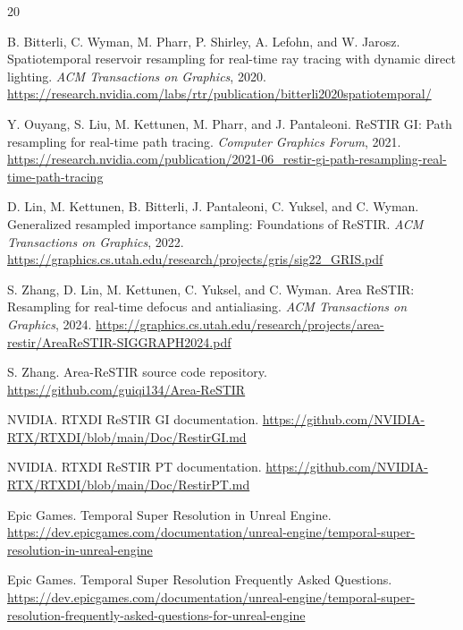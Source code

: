 \documentclass[11pt]{article}
\begin{document}
\clearpage
\begin{thebibliography}{20}
\small

B. Bitterli, C. Wyman, M. Pharr, P. Shirley, A. Lefohn, and W. Jarosz.
\newblock Spatiotemporal reservoir resampling for real-time ray tracing with dynamic direct lighting.
\newblock \emph{ACM Transactions on Graphics}, 2020.
\newblock \url{https://research.nvidia.com/labs/rtr/publication/bitterli2020spatiotemporal/}

Y. Ouyang, S. Liu, M. Kettunen, M. Pharr, and J. Pantaleoni.
\newblock ReSTIR GI: Path resampling for real-time path tracing.
\newblock \emph{Computer Graphics Forum}, 2021.
\newblock \url{https://research.nvidia.com/publication/2021-06_restir-gi-path-resampling-real-time-path-tracing}

D. Lin, M. Kettunen, B. Bitterli, J. Pantaleoni, C. Yuksel, and C. Wyman.
\newblock Generalized resampled importance sampling: Foundations of ReSTIR.
\newblock \emph{ACM Transactions on Graphics}, 2022.
\newblock \url{https://graphics.cs.utah.edu/research/projects/gris/sig22_GRIS.pdf}

S. Zhang, D. Lin, M. Kettunen, C. Yuksel, and C. Wyman.
\newblock Area ReSTIR: Resampling for real-time defocus and antialiasing.
\newblock \emph{ACM Transactions on Graphics}, 2024.
\newblock \url{https://graphics.cs.utah.edu/research/projects/area-restir/AreaReSTIR-SIGGRAPH2024.pdf}

S. Zhang.
\newblock Area-ReSTIR source code repository.
\newblock \url{https://github.com/guiqi134/Area-ReSTIR}

NVIDIA.
\newblock RTXDI ReSTIR GI documentation.
\newblock \url{https://github.com/NVIDIA-RTX/RTXDI/blob/main/Doc/RestirGI.md}

NVIDIA.
\newblock RTXDI ReSTIR PT documentation.
\newblock \url{https://github.com/NVIDIA-RTX/RTXDI/blob/main/Doc/RestirPT.md}

Epic Games.
\newblock Temporal Super Resolution in Unreal Engine.
\newblock \url{https://dev.epicgames.com/documentation/unreal-engine/temporal-super-resolution-in-unreal-engine}

Epic Games.
\newblock Temporal Super Resolution Frequently Asked Questions.
\newblock \url{https://dev.epicgames.com/documentation/unreal-engine/temporal-super-resolution-frequently-asked-questions-for-unreal-engine}


\end{thebibliography}
\end{document}
